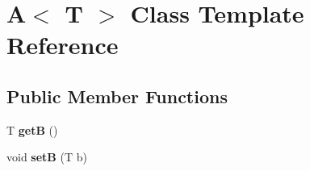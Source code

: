 \hypertarget{class_a}{\section{A$<$ T $>$ Class Template Reference}
\label{class_a}
}
\subsection*{Public Member Functions}
\begin{DoxyCompactItemize}
\item 
\hypertarget{class_a_aa0a94786d9b840b4198bf7451e5f1a4a}{T {\bfseries get\+B} ()}\label{class_a_aa0a94786d9b840b4198bf7451e5f1a4a}

\item 
\hypertarget{class_a_a2092c2e9f587f7d256be03965ecf39f1}{void {\bfseries set\+B} (T b)}\label{class_a_a2092c2e9f587f7d256be03965ecf39f1}

\end{DoxyCompactItemize}
